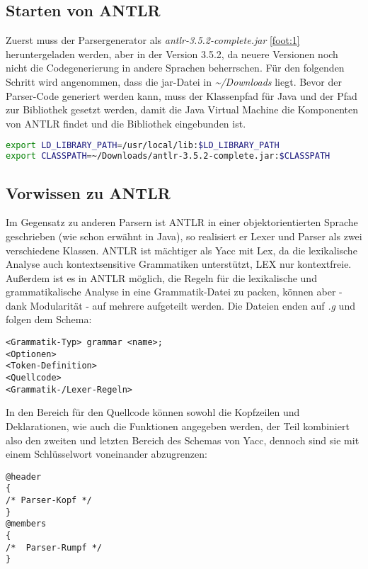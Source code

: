\subsection{Starten von ANTLR}
Zuerst muss der Parsergenerator als \textit{antlr-3.5.2-complete.jar} \ref{foot:1} heruntergeladen werden, aber in der Version 3.5.2, da neuere Versionen noch nicht die Codegenerierung in andere Sprachen beherrschen.
Für den folgenden Schritt wird angenommen, dass die jar-Datei in \textit{\~{}/Downloads} liegt.
Bevor der Parser-Code generiert werden kann, muss der Klassenpfad für Java und der Pfad zur Bibliothek gesetzt werden, damit die Java Virtual Machine die Komponenten von ANTLR findet und die Bibliothek eingebunden ist.
\begin{lstlisting}[language=Bash]
export LD_LIBRARY_PATH=/usr/local/lib:$LD_LIBRARY_PATH
export CLASSPATH=~/Downloads/antlr-3.5.2-complete.jar:$CLASSPATH
\end{lstlisting}

\subsection{Vorwissen zu ANTLR}
Im Gegensatz zu anderen Parsern ist ANTLR in einer objektorientierten Sprache geschrieben (wie schon erwähnt in Java), so realisiert er Lexer und Parser als zwei verschiedene Klassen. ANTLR ist mächtiger als Yacc mit Lex, da die lexikalische Analyse auch kontextsensitive Grammatiken unterstützt, LEX nur kontextfreie.
Außerdem ist es in ANTLR möglich, die Regeln für die lexikalische und grammatikalische Analyse in eine Grammatik-Datei zu packen, können aber - dank Modularität - auf mehrere aufgeteilt werden. Die Dateien enden auf \textit{.g} und folgen dem Schema:\cite{antlr}
\begin{lstlisting}
<Grammatik-Typ> grammar <name>;
<Optionen>
<Token-Definition>
<Quellcode>
<Grammatik-/Lexer-Regeln>
\end{lstlisting}

In den Bereich für den Quellcode können sowohl die Kopfzeilen und Deklarationen, wie auch die Funktionen angegeben werden, der Teil kombiniert also den zweiten und letzten Bereich des Schemas von Yacc, dennoch sind sie mit einem Schlüsselwort voneinander abzugrenzen:
\begin{lstlisting}
@header
{
/* Parser-Kopf */
}
@members
{
/*  Parser-Rumpf */
}
\end{lstlisting}

